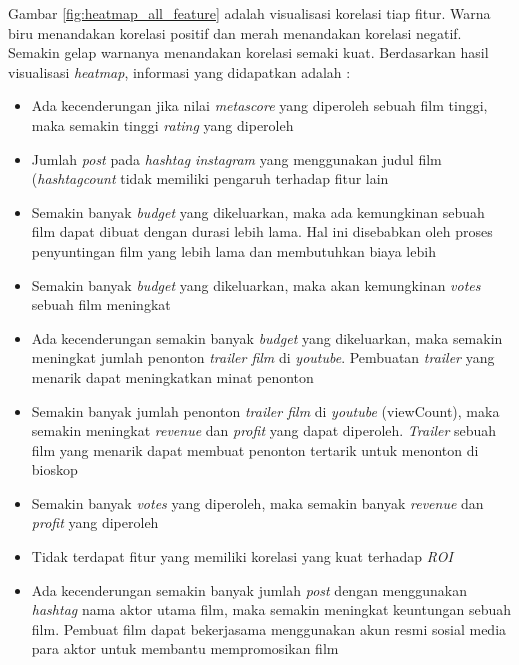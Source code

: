 Gambar \ref{fig:heatmap_all_feature} adalah visualisasi korelasi tiap fitur. Warna biru menandakan korelasi positif dan merah menandakan korelasi negatif. Semakin gelap warnanya menandakan korelasi semaki kuat. Berdasarkan hasil visualisasi \textit{heatmap}, informasi yang didapatkan adalah : 

\begin{itemize}
\item Ada kecenderungan jika nilai \textit{metascore} yang diperoleh sebuah film tinggi, maka semakin tinggi \textit{rating} yang diperoleh 

\item Jumlah \textit{post} pada \textit{hashtag instagram} yang menggunakan judul film (\textit{hashtagcount} tidak memiliki pengaruh terhadap fitur lain 


\item Semakin banyak \textit{budget} yang dikeluarkan, maka ada kemungkinan sebuah film dapat dibuat dengan durasi lebih lama. Hal ini disebabkan oleh proses penyuntingan film yang lebih lama dan membutuhkan biaya lebih

\item Semakin banyak \textit{budget} yang dikeluarkan, maka akan kemungkinan \textit{votes} sebuah film meningkat
 
\item Ada kecenderungan semakin banyak \textit{budget} yang dikeluarkan, maka semakin meningkat jumlah penonton \textit{trailer film} di \textit{youtube}. Pembuatan \textit{trailer} yang menarik dapat meningkatkan minat penonton

\item Semakin banyak jumlah penonton \textit{trailer film} di \textit{youtube} (viewCount), maka semakin meningkat \textit{revenue} dan \textit{profit} yang dapat diperoleh. \textit{Trailer} sebuah film yang menarik dapat membuat penonton tertarik untuk menonton di bioskop

\item Semakin banyak \textit{votes} yang diperoleh, maka semakin banyak \textit{revenue} dan \textit{profit} yang diperoleh 

\item Tidak terdapat fitur yang memiliki  korelasi yang kuat terhadap \textit{ROI}  

\item Ada kecenderungan semakin banyak jumlah \textit{post} dengan menggunakan \textit{hashtag} nama aktor utama film, maka semakin meningkat keuntungan sebuah film. Pembuat film dapat bekerjasama menggunakan akun resmi sosial media para aktor untuk membantu mempromosikan film
\end{itemize}

